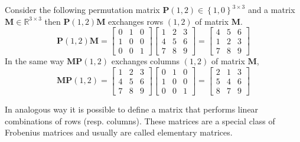 		\begin{example}
			Consider the following permutation matrix $\bm{P}(1,2)\in\left\lbrace 1,0\right\rbrace^{3\times 3}$ and a matrix $\bm{M}\in\mathbb{R}^{3\times 3}$ then $\bm{P}(1,2)\bm{M}$ exchanges rows $(1,2)$ of matrix $\bm{M}$.
			\begin{equation}
			 	\bm{P}(1,2)\bm{M} = 
			 	\begin{bmatrix}
			 		0 & 1 & 0 \\
			 		1 & 0 & 0 \\
			 		0 & 0 & 1 
			 	\end{bmatrix}
			 	\begin{bmatrix}
			 		1 & 2 & 3 \\
			 		4 & 5 & 6 \\
			 		7 & 8 & 9
			 	\end{bmatrix}
			 	= 
			 	\begin{bmatrix}
			 		4 & 5 & 6 \\
			 		1 & 2 & 3 \\
			 		7 & 8 & 9
			 	\end{bmatrix}
			\end{equation}
			In the same way $\bm{MP}(1,2)$ exchanges columns $(1,2)$ of matrix $\bm{M}$,
			\begin{equation}
			 	\bm{MP}(1,2) = 
			 	\begin{bmatrix}
			 		1 & 2 & 3 \\
			 		4 & 5 & 6 \\
			 		7 & 8 & 9
			 	\end{bmatrix}
			 	\begin{bmatrix}
			 		0 & 1 & 0 \\
			 		1 & 0 & 0 \\
			 		0 & 0 & 1 
			 	\end{bmatrix}
			 	= 
			 	\begin{bmatrix}
			 		2 & 1 & 3 \\
			 		5 & 4 & 6 \\
			 		8 & 7 & 9
			 	\end{bmatrix}
			\end{equation}
			
		\end{example}
		In analogous way it is possible to define a matrix that performs linear combinations of rows (resp. columns). These matrices are a special class of Frobenius matrices and usually are called elementary matrices. 
